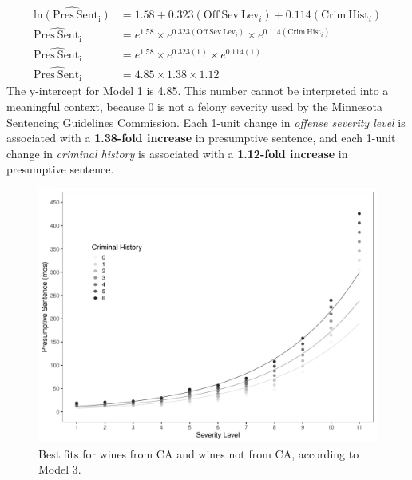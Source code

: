 \documentclass[
  letterpaper,
  DIV=11,
  numbers=noendperiod]{scrartcl}
\begin{document}
\[
\begin{split}
\hat{\mathrm{ln(Pres~Sent_i)}} &= 1.58 + 0.323(\mathrm{Off~Sev~Lev}_i) + 0.114(\mathrm{Crim~Hist}_i)
\\[1em]
\hat{\mathrm{Pres~Sent_i}} &= e^{1.58} \times e^{0.323(\mathrm{Off~Sev~Lev}_i)} \times e^{0.114(\mathrm{Crim~Hist}_i)}
\\[1em]
\hat{\mathrm{Pres~Sent_i}} &= e^{1.58} \times e^{0.323(1)} \times e^{0.114(1)}
\\[1em]
\hat{\mathrm{Pres~Sent_i}} &= 4.85 \times 1.38 \times 1.12
\end{split}
\] The y-intercept for Model 1 is 4.85. This number cannot be
interpreted into a meaningful context, because 0 is not a felony
severity used by the Minnesota Sentencing Guidelines Commission. Each
1-unit change in \emph{offense severity level} is associated with a
\textbf{1.38-fold increase} in presumptive sentence, and each 1-unit
change in \emph{criminal history} is associated with a \textbf{1.12-fold
increase} in presumptive sentence.

\begin{figure}

{\centering \includegraphics{sentencing_grid_files/figure-pdf/fig-fits-1.pdf}

}

\caption{\label{fig-fits}Best fits for wines from CA and wines not from
CA, according to Model 3.}

\end{figure}
\end{document}
